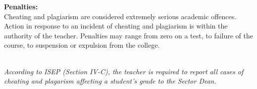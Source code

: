 {\textbf{Penalties:}\\
Cheating and plagiarism are considered extremely serious academic
offences. Action in response to an incident of cheating and
plagiarism is within the authority of the teacher.
Penalties may range from zero on a test, to failure of the
course, to suspension or expulsion from the college.\\ \\ \vspace{-0.1in}

\textit{According to ISEP (Section IV-C), the teacher is required to report all cases of cheating and plagarism affecting a student's grade to the Sector Dean.}
}

\newcommand{\literacy}{
\large{\textbf{Literacy Policy}}\\
\vspace{-0.15in}\hline \bigskip \normalsize
Problem solving is an essential component of this course.  Students will be expected to analyze problems stated in words, to present their solutions logically and coherently, and to display their answers in a form corresponding to the statement of the problem, including appropriate units of measurement.  Marks will be deducted for work which is inadequate in their respects, even though the answers may be numerically correct.
}

